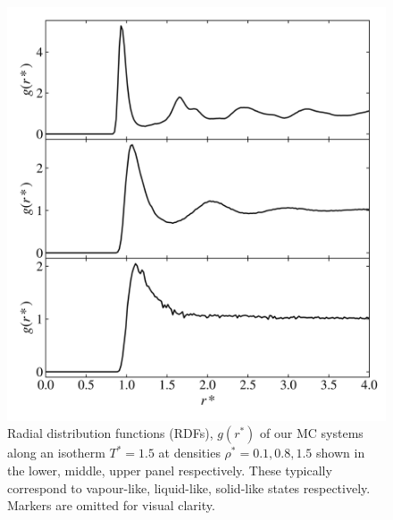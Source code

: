 \documentclass[10pt, twocolumn]{revtex4}    %
\begin{document}

\begin{figure}
	\includegraphics[width=\linewidth]{figures/rdfs/RDFs.png}
	\caption{Radial distribution functions (RDFs), $g(r^{*})$ of our MC systems along an isotherm $T^{*}=1.5$ at densities $\rho{}^{*}=0.1, 0.8, 1.5$ shown in the lower, middle, upper panel respectively. These typically correspond to vapour-like, liquid-like, solid-like states respectively. Markers are omitted for visual clarity.}
	\label{fig:RDFs}
\end{figure}
\end{document}
